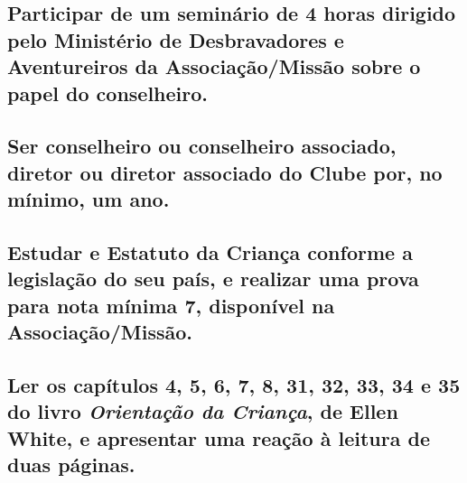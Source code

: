 \subsection{Participar de um seminário de 4 horas dirigido pelo Ministério de Desbravadores e Aventureiros da Associação/Missão sobre o papel do conselheiro.}

\subsection{Ser conselheiro ou conselheiro associado, diretor ou diretor associado do Clube por, no mínimo, um ano.}

\subsection{Estudar e Estatuto da Criança conforme a legislação do seu país, e realizar uma prova para nota mínima 7, disponível na Associação/Missão.}

\subsection{Ler os capítulos 4, 5, 6, 7, 8, 31, 32, 33, 34 e 35 do livro \emph{Orientação da Criança}, de Ellen White, e apresentar uma reação à leitura de duas páginas.}